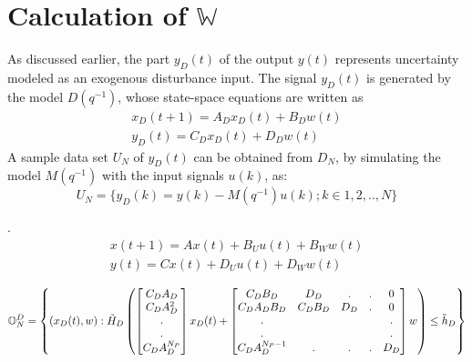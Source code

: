 \documentclass[letterpaper, 10 pt, conference]{ieeeconf}  %
\begin{document}
  \section{Calculation of $\mathbb{W}$}
  \noindent
  As discussed earlier, the part $y_D(t)$ of the output $y(t)$ represents uncertainty modeled as an exogenous disturbance input. The signal $y_D(t)$ is generated by the model $D(q^{-1})$, whose state-space equations are written as 
  \begin{equation}
  \begin{matrix}
  x_D(t+1) = A_Dx_D(t)+B_Dw(t)  \\
  y_D(t) = C_Dx_D(t)+D_Dw(t)
  \end{matrix}
  \label{ssD}
  \end{equation}
  A sample data set $U_N$ of $y_D(t)$ can be obtained from $D_N$, by simulating the model $M(q^{-1})$ with the input signals $u(k)$, as:
  \begin{equation}
  U_N=\{y_D(k)=y(k)-M(q^{-1})u(k);k \in 1,2,..,N\}
  \end{equation}

 {\color{red}{with the initial condition $x_M(0)=0$}}.
 \\
  \begin{equation}
  \begin{matrix}
  x(t+1)=Ax(t)+B_Uu(t)+B_Ww(t) \\
  y(t)=Cx(t)+D_Uu(t)+D_Ww(t) 
  \end{matrix} 
  \label{ssmodel_condensed}
  \end{equation}
  \begin{table}[t]
   \begin{equation}
   \small
   \mathbb{O}_N^D=\begin{Bmatrix}(x_D(t),w):\tilde{H}_D\begin{pmatrix}\begin{bmatrix} C_DA_D\\ C_DA_D^2 \\ . \\ . \\ C_DA_D^{N_P}\end{bmatrix}x_D(t) + \begin{bmatrix}
   C_DB_D & D_D & . & . & 0 \\
   C_DA_DB_D & C_DB_D & D_D & . & 0 \\
   . &  &  &  & . \\
   . &  &  &  & . \\
   C_DA_D^{N_P-1} & . & . & . & D_D
   \end{bmatrix}w\end{pmatrix} \leq \tilde{h}_D
   \end{Bmatrix}
   \label{OND_set}
   \end{equation} 
  \end{table}
\end{document}
